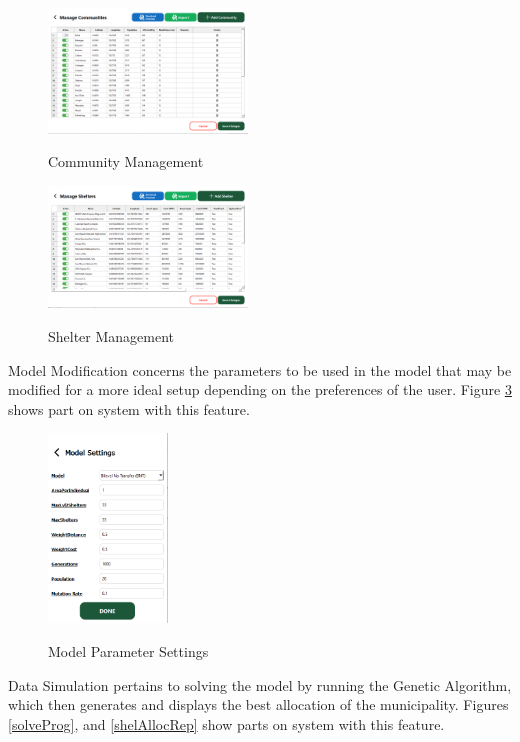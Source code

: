 \documentclass[12pt,a4paper,]{article}
\begin{document}
	\begin{figure}[h!]
		\caption{Community Management}
		\centering
		\includegraphics[width=200px]{Chapter 4/commadvanced}
		\label{commMan}
	\end{figure}
	
	\begin{figure}[h!]
		\caption{Shelter Management}
		\centering
		\includegraphics[width=200px]{Chapter 4/sheladvanced}
		\label{shelMan}
	\end{figure}
	
	Model Modification concerns the parameters to be used in the model that may be modified for a more ideal setup depending on the preferences of the user.   Figure \ref{modelSet} shows part on system with this feature.
	
	\begin{figure}[h!]
		\caption{Model Parameter Settings}
		\centering
		\includegraphics[width=120px]{Chapter 4/modelsettings}
		\label{modelSet}
	\end{figure}
	
	Data Simulation pertains to solving the model by running the Genetic Algorithm, which then generates and displays the best allocation of the municipality. Figures \ref{solveProg}, and \ref{shelAllocRep} show parts on system with this feature.
	
\end{document}
